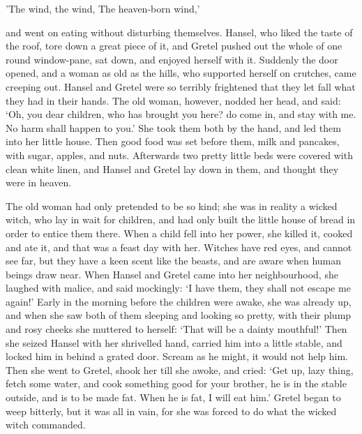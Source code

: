 \documentclass[oneside,10pt]{memoir} %
\begin{document}
'The wind, the wind,
The heaven-born wind,'

and went on eating without disturbing themselves. Hansel, who liked the taste of the roof, tore down a great piece of it, and Gretel pushed out the whole of one round window-pane, sat down, and enjoyed herself with it. Suddenly the door opened, and a woman as old as the hills, who supported herself on crutches, came creeping out. Hansel and Gretel were so terribly frightened that they let fall what they had in their hands. The old woman, however, nodded her head, and said: `Oh, you dear children, who has brought you here? do come in, and stay with me. No harm shall happen to you.' She took them both by the hand, and led them into her little house. Then good food was set before them, milk and pancakes, with sugar, apples, and nuts. Afterwards two pretty little beds were covered with clean white linen, and Hansel and Gretel lay down in them, and thought they were in heaven.

The old woman had only pretended to be so kind; she was in reality a wicked witch, who lay in wait for children, and had only built the little house of bread in order to entice them there. When a child fell into her power, she killed it, cooked and ate it, and that was a feast day with her. Witches have red eyes, and cannot see far, but they have a keen scent like the beasts, and are aware when human beings draw near. When Hansel and Gretel came into her neighbourhood, she laughed with
malice, and said mockingly: `I have them, they shall not escape me again!' Early in the morning before the children were awake, she was already up, and when she saw both of them sleeping and looking so pretty, with their plump and rosy cheeks she muttered to herself: `That will be a dainty mouthful!' Then she seized Hansel with her shrivelled hand, carried him into a little stable, and locked him in behind a grated door. Scream as he might, it would not help him. Then she went to
Gretel, shook her till she awoke, and cried: `Get up, lazy thing, fetch some water, and cook something good for your brother, he is in the stable outside, and is to be made fat. When he is fat, I will eat him.' Gretel began to weep bitterly, but it was all in vain, for she was forced to do what the wicked witch commanded.
\end{document}
